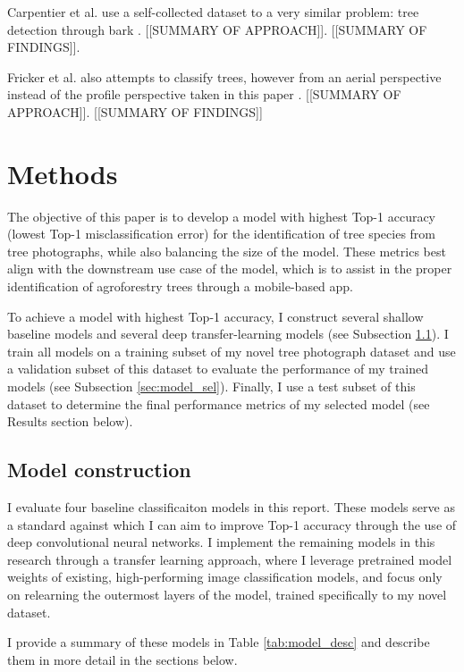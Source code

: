 \documentclass[10pt,twocolumn,letterpaper]{article}
\begin{document}
Carpentier et al. use a self-collected dataset to a very similar problem: tree detection through bark \cite{Carpentier_2018}. [[SUMMARY OF APPROACH]]. [[SUMMARY OF FINDINGS]].

Fricker et al. also attempts to classify trees, however from an aerial perspective instead of the profile perspective taken in this paper \cite{Fricker_RS_2019}. [[SUMMARY OF APPROACH]]. [[SUMMARY OF FINDINGS]]

\section{Methods}
\label{sec:methods}
The objective of this paper is to develop a model with highest Top-1 accuracy (lowest Top-1 misclassification error) for the identification of tree species from tree photographs, while also balancing the size of the model. These metrics best align with the downstream use case of the model, which is to assist in the proper identification of agroforestry trees through a mobile-based app. 

To achieve a model with highest Top-1 accuracy, I construct several shallow baseline models and several deep transfer-learning models (see Subsection \ref{sec:models}). I train all models on a training subset of my novel tree photograph dataset and use a validation subset of this dataset to evaluate the performance of my trained models (see Subsection \ref{sec:model_sel}). Finally, I use a test subset of this dataset to determine the final performance metrics of my selected model (see Results section below).  

\subsection{Model construction}
\label{sec:models}
I evaluate four baseline classificaiton models in this report. These models serve as a standard against which I can aim to improve Top-1 accuracy through the use of deep convolutional neural networks. I implement the remaining models in this research through a transfer learning approach, where I leverage pretrained model weights of existing, high-performing image classification models, and focus only on relearning the outermost layers of the model, trained specifically to my novel dataset.

I provide a summary of these models in Table \ref{tab:model_desc} and describe them in more detail in the sections below.
\end{document}
